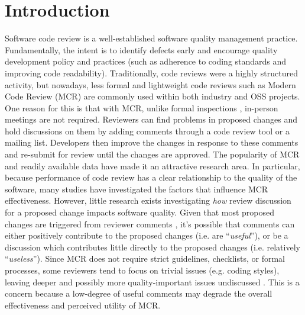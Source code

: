
\section{Introduction}
Software code review is a well-established software quality management practice.
Fundamentally, the intent is to identify defects early and encourage quality development policy and practices (such as adherence to coding standards and improving code readability).
Traditionally, code reviews were a highly structured activity, but nowadays, less formal and lightweight code reviews such as Modern Code Review (MCR)\cite{Bacchelli2013a} are commonly used within both industry and OSS projects. 
One reason for this is that with MCR, unlike formal inspections \cite{Beller}, in-person meetings are not required.
Reviewers can find problems in proposed changes and hold discussions on them by adding comments through a code review tool or a mailing list.
Developers then improve the changes in response to these comments and re-submit for review until the changes are approved.  
The popularity of MCR and readily available data have made it an attractive research area.  
In particular, because performance of code review has a clear relationship to the quality of the software, many studies have investigated the factors that influence MCR\cite{Baysal2001,Mcintosh,Beller,Hamasaki2013} effectiveness.
However, little research exists investigating \emph{how} review discussion for a proposed change impacts software quality.
Given that most proposed changes are triggered from reviewer comments \cite{Beller}, 
it's possible that comments can either positively contribute to the proposed changes (i.e. are ``\emph{useful}''), or be a discussion which contributes little directly to the proposed changes (i.e. relatively ``\emph{useless}''). 
Since MCR does not require strict guidelines, checklists, or formal processes, some reviewers tend to focus on trivial issues (e.g. coding styles), leaving deeper and possibly more quality-important issues undiscussed \cite{Bacchelli2013a}.
This is a concern because a low-degree of useful comments may degrade the overall effectiveness \cite{Prasetyo2012,Gottipati2011} and perceived utility of MCR.

